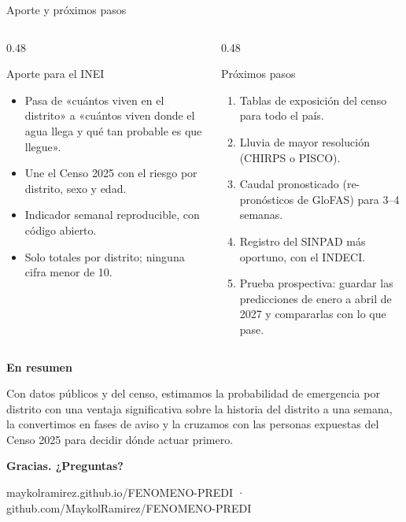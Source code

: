 \documentclass[aspectratio=169,11pt]{beamer}
\begin{document}
\begin{frame}{Aporte y próximos pasos}
\begin{columns}[T]
\begin{column}{0.48\textwidth}
\begin{caja}[verde]{Aporte para el INEI}
\begin{itemize}\footnotesize
\item Pasa de «cuántos viven en el distrito» a «cuántos viven donde el agua llega y qué tan probable es que llegue».
\item Une el Censo 2025 con el riesgo por distrito, sexo y edad.
\item Indicador semanal reproducible, con código abierto.
\item Solo totales por distrito; ninguna cifra menor de 10.
\end{itemize}
\end{caja}
\end{column}
\begin{column}{0.48\textwidth}
\begin{caja}{Próximos pasos}
\begin{enumerate}\footnotesize
\item Tablas de exposición del censo para todo el país.
\item Lluvia de mayor resolución (CHIRPS o PISCO).
\item Caudal pronosticado (re-pronósticos de GloFAS) para 3–4 semanas.
\item Registro del SINPAD más oportuno, con el INDECI.
\item Prueba prospectiva: guardar las predicciones de enero a abril de 2027 y compararlas con lo que pase.
\end{enumerate}
\end{caja}
\end{column}
\end{columns}
\end{frame}

{
\begin{frame}\color{white}\vspace{2em}
{\Large\bfseries En resumen}\par\vspace{0.5em}{\color{naranja}\rule{4em}{2pt}}\par\vspace{0.8em}
\small Con datos públicos y del censo, estimamos la probabilidad de emergencia por distrito con una ventaja significativa sobre la historia del distrito a una semana, la convertimos en fases de aviso y la cruzamos con las personas expuestas del Censo 2025 para decidir dónde actuar primero.\par\vspace{1.5em}
{\Large\bfseries Gracias. ¿Preguntas?}\par\vspace{1em}
{\scriptsize maykolramirez.github.io/FENOMENO-PREDI · github.com/MaykolRamirez/FENOMENO-PREDI}
\end{frame}}
\end{document}
